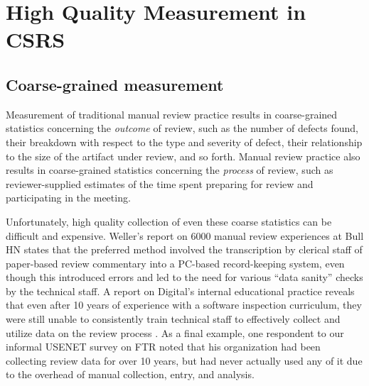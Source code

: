 
\section{High Quality Measurement in CSRS}
\label{sec:metrics}

\subsection{Coarse-grained measurement}

Measurement of traditional manual review practice results in coarse-grained
statistics concerning the {\em outcome} of review, such as the number of
defects found, their breakdown with respect to the type and severity of
defect, their relationship to the size of the artifact under review, and so
forth.  Manual review practice also results in coarse-grained statistics
concerning the {\em process} of review, such as reviewer-supplied estimates
of the time spent preparing for review and participating in the meeting.

Unfortunately, high quality collection of even these coarse statistics can
be difficult and expensive.  Weller's report on 6000 manual review
experiences at Bull HN states that the preferred method involved the
transcription by clerical staff of paper-based review commentary into a
PC-based record-keeping system, even though this introduced errors and led
to the need for various ``data sanity'' checks by the technical
staff.  A report on Digital's internal
educational practice reveals that even after 10 years of experience with a
software inspection curriculum, they were still unable to consistently
train technical staff to effectively collect and utilize data on the review
process \cite{Hutchings93}. As a final example, one respondent to our
informal USENET survey on FTR noted that his organization had been
collecting review data for over 10 years, but had never actually used any
of it due to the overhead of manual collection, entry, and analysis. 

